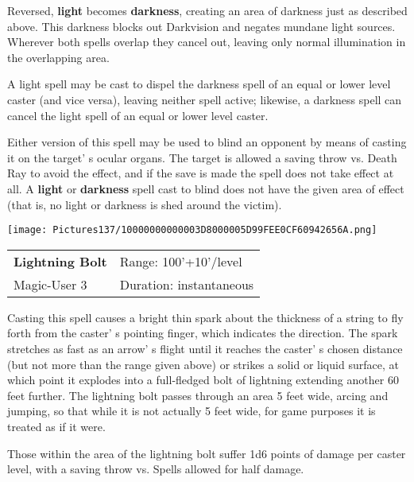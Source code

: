 \documentclass[a4paper,twoside,openany,10pt]{book}
\begin{document}
\begin{multicols}{2}
Reversed, \textbf{light} becomes \textbf{darkness}, creating an area of darkness just as described above. This darkness blocks out Darkvision and negates mundane light sources. Wherever both spells overlap they cancel out, leaving only normal illumination in the overlapping area. 

A light spell may be cast to dispel the darkness spell of an equal or lower level caster (and vice versa), leaving neither spell active; likewise, a darkness spell can cancel the light spell of an equal or lower level caster.

Either version of this spell may be used to blind an opponent by means of casting it on the target' s ocular organs. The target is allowed a saving throw vs. Death Ray to avoid the effect, and if the save is made the spell does not take effect at all. A \textbf{light} or \textbf{darkness} spell cast to blind does not have the given area of effect (that is, no light or darkness is shed around the victim).

\medskip

\begin{flushleft}
\texttt{[image: Pictures137/10000000000003D8000005D99FEE0CF60942656A.png]}
\end{flushleft}

\smallskip\begin{flushleft} 
	\begin{tabularx}{0.45\textwidth}{@{}m{3.5cm}m{5.5cm}@{}} 
		\textbf{Lightning Bolt} & Range: 100'+10'/level\\
Magic-User 3 &Duration: instantaneous\\
	\end{tabularx}\end{flushleft}

Casting this spell causes a bright thin spark about the thickness of a string to fly forth from the caster' s pointing finger, which indicates the direction. The spark stretches as fast as an arrow' s flight until it reaches the caster' s chosen distance (but not more than the range given above) or strikes a solid or liquid surface, at which point it explodes into a full-fledged bolt of lightning extending another 60 feet further. The lightning bolt passes through an area 5 feet wide, arcing and jumping, so that while it is not actually 5 feet wide, for game purposes it is treated as if it were.

Those within the area of the lightning bolt suffer 1d6 points of damage per caster level, with a saving throw vs. Spells allowed for half damage.


\end{multicols}
\end{document}
